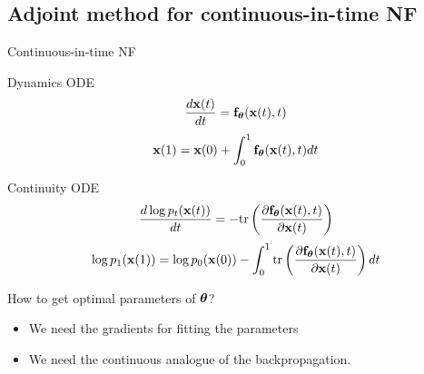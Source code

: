 \subsection{Adjoint method for continuous-in-time NF}
\begin{frame}{Continuous-in-time NF}
	\begin{block}{Dynamics ODE}
		\vspace{-0.3cm}
		\[
			 \frac{d \mathbf{x}(t)}{dt} = \mathbf{f}_{\boldsymbol{\theta}}(\mathbf{x}(t), t) 	 
 		\]
 		\[
			 \mathbf{x}(1) = \mathbf{x}(0) + \int_{0}^{1} \mathbf{f}_{\boldsymbol{\theta}}(\mathbf{x}(t), t) dt 
		\]
		\vspace{-0.5cm}
	\end{block}
	\begin{block}{Continuity ODE}
		\vspace{-0.2cm}
		\[
				\frac{d \log p_t(\mathbf{x}(t))}{d t} = - \text{tr} \left( \frac{\partial \mathbf{f}_{\boldsymbol{\theta}}(\mathbf{x}(t), t)}{\partial \mathbf{x}(t)} \right) 
 		\]
 		\[
				\log p_1(\mathbf{x}(1)) = \log p_0(\mathbf{x}(0)) - \int_{0}^{1} \text{tr} \left( \frac{\partial \mathbf{f}_{\boldsymbol{\theta}}(\mathbf{x}(t), t)}{\partial \mathbf{x}(t)} \right) dt
		\]
		\vspace{-0.3cm}
	\end{block}
	\begin{block}{How to get optimal parameters of $\boldsymbol{\theta}$?}
		\begin{itemize}
			\item We need the gradients for fitting the parameters
			\item We need the continuous analogue of the backpropagation.
		\end{itemize}
	\end{block}
	
\end{frame}
